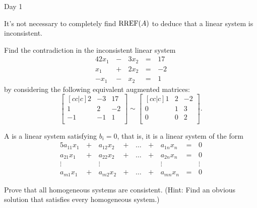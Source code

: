 \begin{applicationActivities}{Day 1}
\begin{remark}
  It's not necessary to completely find \(\operatorname{RREF}(A)\) to
  deduce that a linear system is inconsistent.
\end{remark}

\begin{activity}
  Find the contradiction in the inconsistent linear system
    \begin{alignat*}{4}
      2x_1 &\,-\,& 3x_2 &\,=\,& 17 \\
       x_1 &\,+\,& 2x_2 &\,=\,& -2 \\
      -x_1 &\,-\,&  x_2 &\,=\,& 1
    \end{alignat*}
  by considering the following equivalent augmented matrices:
  \[
    \begin{bmatrix}[cc|c]
       2 & -3 & 17 \\
       1 &  2 & -2 \\
      -1 & -1 &  1 \\
    \end{bmatrix}\sim
    \begin{bmatrix}[cc|c]
       1 &  2 & -2 \\
       0 &  1 &  3 \\
       0 &  0 &  2 \\
    \end{bmatrix}
  .\]
\end{activity}

\begin{definition}
  A  is a linear system satisfying \(b_i=0\), that is,
  it is a linear system of the form
  \begin{alignat*}{5}
    a_{11}x_1 &\,+\,& a_{12}x_2 &\,+\,& \dots  &\,+\,& a_{1n}x_n &\,=\,& 0 \\
    a_{21}x_1 &\,+\,& a_{22}x_2 &\,+\,& \dots  &\,+\,& a_{2n}x_n &\,=\,& 0 \\
     \vdots&  &\vdots&   &&  &\vdots&&\vdots  \\
    a_{m1}x_1 &\,+\,& a_{m2}x_2 &\,+\,& \dots  &\,+\,& a_{mn}x_n &\,=\,& 0
  \end{alignat*}
\end{definition}

\begin{activity}
  Prove that all homogeneous systems are consistent.
  (Hint: Find an obvious solution that satisfies every homogeneous
  system.)
\end{activity}



\end{applicationActivities}
